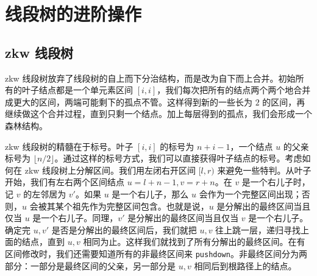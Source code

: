 \chapter{线段树的进阶操作}

\section{zkw 线段树}

zkw 线段树放弃了线段树的自上而下分治结构，而是改为自下而上合并。初始所有的叶子结点都是一个单元素区间 $[i,i]$，我们每次把所有的结点两个两个地合并成更大的区间，两端可能剩下的孤点不管。这样得到新的一些长为 $2$ 的区间，再继续做这个合并过程，直到只剩一个结点。加上每层得到的孤点，我们会形成一个森林结构。

zkw 线段树的精髓在于标号。叶子 $[i,i]$ 的标号为 $n+i-1$，一个结点 $u$ 的父亲标号为 $\lfloor n/2\rfloor$。通过这样的标号方式，我们可以直接获得叶子结点的标号。考虑如何在 zkw 线段树上分解区间。我们用左闭右开区间 $[l,r)$ 来避免一些特判。从叶子开始，我们有左右两个区间结点 $u=l+n-1,v=r+n$。在 $v$ 是一个右儿子时，记 $v$ 的左邻居为 $v'$。如果 $u$ 是一个右儿子，那么 $u$ 会作为一个完整区间出现；否则，$u$ 会被其某个祖先作为完整区间包含。也就是说，$u$ 是分解出的最终区间当且仅当 $u$ 是一个右儿子。同理，$v'$ 是分解出的最终区间当且仅当 $v$ 是一个右儿子。确定完 $u,v'$ 是否是分解出的最终区间后，我们就把 $u,v$ 往上跳一层，递归寻找上面的结点，直到 $u,v$ 相同为止。这样我们就找到了所有分解出的最终区间。在有区间修改时，我们还需要知道所有的非最终区间来 \texttt{pushdown}。非最终区间分为两部分：一部分是最终区间的父亲，另一部分是 $u,v$ 相同后到根路径上的结点。

